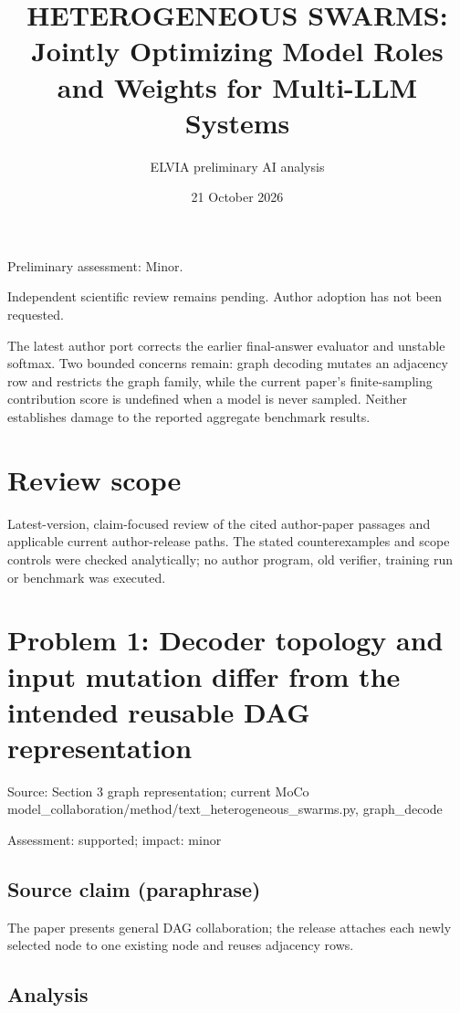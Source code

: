 \documentclass[11pt]{article}
\begin{document}
\title{HETEROGENEOUS SWARMS: Jointly Optimizing Model Roles and Weights for Multi-LLM Systems}

\author{ELVIA preliminary AI analysis}\date{21 October 2026}\maketitle

Preliminary assessment: Minor.\par

Independent scientific review remains pending. Author adoption has not been requested.

The latest author port corrects the earlier final-answer evaluator and unstable softmax. Two bounded concerns remain: graph decoding mutates an adjacency row and restricts the graph family, while the current paper’s finite-sampling contribution score is undefined when a model is never sampled. Neither establishes damage to the reported aggregate benchmark results.

\section*{Review scope}

Latest-version, claim-focused review of the cited author-paper passages and applicable current author-release paths. The stated counterexamples and scope controls were checked analytically; no author program, old verifier, training run or benchmark was executed.

\section*{Problem 1: Decoder topology and input mutation differ from the intended reusable DAG representation}

Source: Section 3 graph representation; current MoCo model\_collaboration/method/text\_heterogeneous\_swarms.py, graph\_decode

Assessment: supported; impact: minor

\subsection*{Source claim (paraphrase)}

The paper presents general DAG collaboration; the release attaches each newly selected node to one existing node and reuses adjacency rows.

\subsection*{Analysis}
\end{document}
